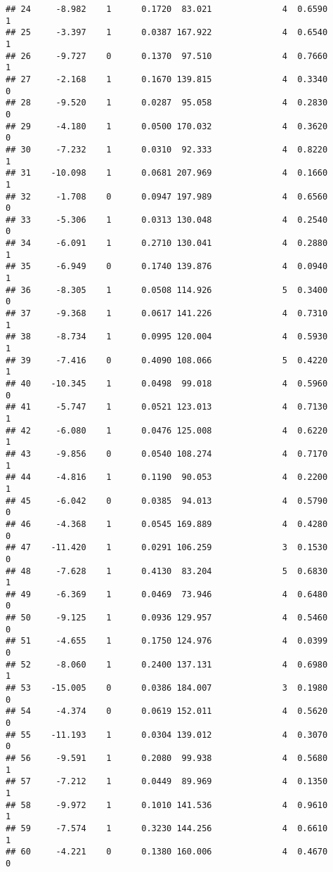 \documentclass[
]{article}
\begin{document}
\begin{verbatim}
## 24     -8.982    1      0.1720  83.021              4  0.6590      1
## 25     -3.397    1      0.0387 167.922              4  0.6540      1
## 26     -9.727    0      0.1370  97.510              4  0.7660      1
## 27     -2.168    1      0.1670 139.815              4  0.3340      0
## 28     -9.520    1      0.0287  95.058              4  0.2830      0
## 29     -4.180    1      0.0500 170.032              4  0.3620      0
## 30     -7.232    1      0.0310  92.333              4  0.8220      1
## 31    -10.098    1      0.0681 207.969              4  0.1660      1
## 32     -1.708    0      0.0947 197.989              4  0.6560      0
## 33     -5.306    1      0.0313 130.048              4  0.2540      0
## 34     -6.091    1      0.2710 130.041              4  0.2880      1
## 35     -6.949    0      0.1740 139.876              4  0.0940      1
## 36     -8.305    1      0.0508 114.926              5  0.3400      0
## 37     -9.368    1      0.0617 141.226              4  0.7310      1
## 38     -8.734    1      0.0995 120.004              4  0.5930      1
## 39     -7.416    0      0.4090 108.066              5  0.4220      1
## 40    -10.345    1      0.0498  99.018              4  0.5960      0
## 41     -5.747    1      0.0521 123.013              4  0.7130      1
## 42     -6.080    1      0.0476 125.008              4  0.6220      1
## 43     -9.856    0      0.0540 108.274              4  0.7170      1
## 44     -4.816    1      0.1190  90.053              4  0.2200      1
## 45     -6.042    0      0.0385  94.013              4  0.5790      0
## 46     -4.368    1      0.0545 169.889              4  0.4280      0
## 47    -11.420    1      0.0291 106.259              3  0.1530      0
## 48     -7.628    1      0.4130  83.204              5  0.6830      1
## 49     -6.369    1      0.0469  73.946              4  0.6480      0
## 50     -9.125    1      0.0936 129.957              4  0.5460      0
## 51     -4.655    1      0.1750 124.976              4  0.0399      0
## 52     -8.060    1      0.2400 137.131              4  0.6980      1
## 53    -15.005    0      0.0386 184.007              3  0.1980      0
## 54     -4.374    0      0.0619 152.011              4  0.5620      0
## 55    -11.193    1      0.0304 139.012              4  0.3070      0
## 56     -9.591    1      0.2080  99.938              4  0.5680      1
## 57     -7.212    1      0.0449  89.969              4  0.1350      1
## 58     -9.972    1      0.1010 141.536              4  0.9610      1
## 59     -7.574    1      0.3230 144.256              4  0.6610      1
## 60     -4.221    0      0.1380 160.006              4  0.4670      0

\end{verbatim}
\end{document}
